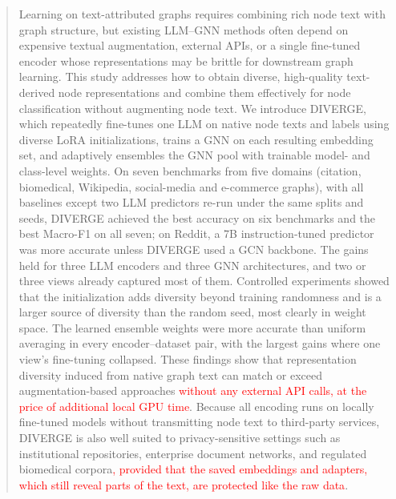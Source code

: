 \documentclass[a4paper,fleqn]{cas-sc}
\newcommand{\revone}[1]{\textcolor{red}{#1}}   %
\DeclareRobustCommand{\revcommon}[2][]{\textcolor{revshared}{#2}} %
\begin{document}
\begin{abstract}
Learning on text-attributed graphs requires combining rich node text with graph structure, but existing LLM--GNN methods often depend on expensive textual augmentation, external APIs, or a single fine-tuned encoder whose representations may be brittle for downstream graph learning.
This study addresses how to obtain diverse, high-quality text-derived node representations and combine them effectively for node classification without augmenting node text. We introduce DIVERGE, which repeatedly fine-tunes one LLM on native node texts and labels using diverse LoRA initializations, trains a GNN on each resulting embedding set, and adaptively ensembles the GNN pool with trainable model- and class-level weights.
\revcommon[R1,R2,R4]{On seven benchmarks from five domains (citation, biomedical, Wikipedia, social-media and e-commerce graphs), with all baselines except two LLM predictors re-run under the same splits and seeds, DIVERGE achieved the best accuracy on six benchmarks and the best Macro-F1 on all seven; on Reddit, a 7B instruction-tuned predictor was more accurate unless DIVERGE used a GCN backbone. The gains held for three LLM encoders and three GNN architectures, and two or three views already captured most of them. Controlled experiments showed that the initialization adds diversity beyond training randomness and is a larger source of diversity than the random seed, most clearly in weight space. The learned ensemble weights were more accurate than uniform averaging in every encoder--dataset pair, with the largest gains where one view's fine-tuning collapsed.} These findings show that representation diversity induced from native graph text can match or exceed augmentation-based approaches \revone{without any external API calls, at the price of additional local GPU time}. Because all encoding runs on locally fine-tuned models without transmitting node text to third-party services, DIVERGE is also well suited to privacy-sensitive settings such as institutional repositories, enterprise document networks, and regulated biomedical corpora\revone{, provided that the saved embeddings and adapters, which still reveal parts of the text, are protected like the raw data}.
\end{abstract}


\end{document}

